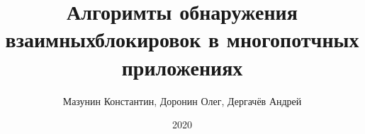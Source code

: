 \title{Алгоримты обнаружения взаимныхблокировок в многопотчных приложениях}
\author{Мазунин Константин, Доронин Олег, Дергачёв Андрей}
\date{2020}

\maketitle

\clearpage
